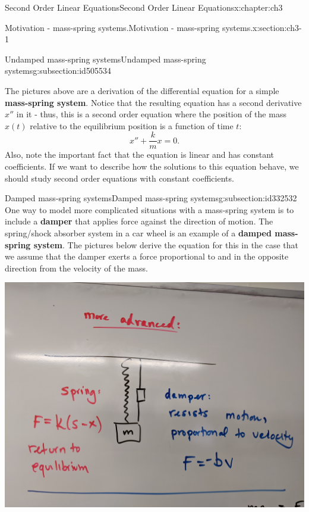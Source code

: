 \documentclass[oneside,10pt,]{book}
\newcommand{\terminology}[1]{\textbf{#1}}
\numberwithin{equation}{section}
\numberwithin{equation}{section}
\begin{document}
\begin{chapterptx}{Second Order Linear Equations}{}{Second Order Linear Equations}{}{}{x:chapter:ch3}
\begin{sectionptx}{Motivation - mass-spring systems.}{}{Motivation - mass-spring systems.}{}{}{x:section:ch3-1}
\begin{subsectionptx}{Undamped mass-spring systems}{}{Undamped mass-spring systems}{}{}{g:subsection:id505534}
\begin{image}{0}{1}{0}
\end{image}%
The pictures above are a derivation of the differential equation for a simple \terminology{mass-spring system}. Notice that the resulting equation has a second derivative \(x''\) in it - thus, this is a second order equation where the position of the mass \(x(t)\) relative to the equilibrium position is a function of time \(t\):%
\begin{equation*}
x'' + \frac{k}{m} x = 0.
\end{equation*}
Also, note the important fact that the equation is linear and has constant coefficients. If we want to describe how the solutions to this equation behave, we should study second order equations with constant coefficients.%
\end{subsectionptx}
%
%
\typeout{************************************************}
\typeout{************************************************}
%
\begin{subsectionptx}{Damped mass-spring systems}{}{Damped mass-spring systems}{}{}{g:subsection:id332532}
One way to model more complicated situations with a mass-spring system is to include a \terminology{damper} that applies force against the direction of motion. The spring\slash{}shock absorber system in a car wheel is an example of a \terminology{damped mass-spring system}. The pictures below derive the equation for this in the case that we assume that the damper exerts a force proportional to and in the opposite direction from the velocity of the mass.%
\begin{image}{0}{1}{0}%
\includegraphics[width=\linewidth]{images/damped1.jpg}

\end{image}
\end{subsectionptx}
\end{sectionptx}
\end{chapterptx}
\end{document}
